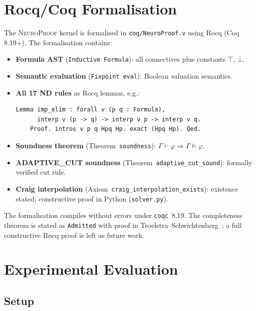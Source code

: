 \documentclass[conference]{IEEEtran}
\newcommand{\entails}{\vDash}
\newcommand{\proves}{\vdash}
\newcommand{\dlbot}{\bot}
\newcommand{\dltop}{\top}
\newcommand{\NP}{\textsc{NeuroProof}}
\begin{document}
\section{Rocq/Coq Formalisation}
\label{sec:rocq}

The \NP{} kernel is formalised in \texttt{coq/NeuroProof.v} using Rocq
(Coq 8.19+).  The formalisation contains:

\begin{itemize}
  \item \textbf{Formula AST} (\texttt{Inductive Formula}): all connectives
    plus constants $\dltop$, $\dlbot$.
  \item \textbf{Semantic evaluation} (\texttt{Fixpoint eval}):
    Boolean valuation semantics.
  \item \textbf{All 17 ND rules} as Rocq lemmas, e.g.:
    \begin{lstlisting}[gobble=4]
    Lemma imp_elim : forall v (p q : Formula),
      interp v (p -> q) -> interp v p -> interp v q.
    Proof. intros v p q Hpq Hp. exact (Hpq Hp). Qed.
    \end{lstlisting}
  \item \textbf{Soundness theorem}
    (Theorem~\texttt{soundness}):
    $\Gamma \proves \varphi \Rightarrow \Gamma \entails \varphi$.
  \item \textbf{ADAPTIVE\_CUT soundness}
    (Theorem~\texttt{adaptive\_cut\_sound}):
    formally verified cut rule.
  \item \textbf{Craig interpolation}
    (Axiom~\texttt{craig\_interpolation\_exists}):
    existence stated; constructive proof in Python (\texttt{solver.py}).
\end{itemize}

The formalisation compiles without errors under \texttt{coqc}~8.19.
The completeness theorem is stated as \texttt{Admitted} with proof in
Troelstra--Schwichtenberg~\cite{TroelstraSchwichtenberg2000}; a full
constructive Rocq proof is left as future work.

\section{Experimental Evaluation}
\label{sec:experiments}

\subsection{Setup}
\end{document}
